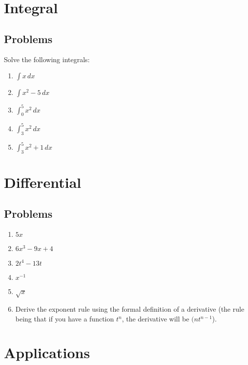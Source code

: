 \documentclass{book}
\begin{document}
\part{Integral}



\chapter{Problems}
Solve the following integrals:

\begin{enumerate}
    \item $\int x \, dx$
    \item $\int x^2-5 \, dx$
    \item $\int^5_0 x^2 \, dx$
    \item $\int^5_3 x^2 \, dx$
    \item $\int^5_3 x^2 + 1 \, dx$
\end{enumerate}

\part{Differential}



\chapter{Problems}
\begin{enumerate}
    \item $5x$
    \item $6x^3 - 9x + 4$
    \item $2t^4 - 13t$
    \item $x^{-1}$
    \item $\sqrt{x}$
    \item Derive the exponent rule using the formal definition of a derivative (the rule being that if you have a function $t^n$, the derivative will be $(nt^{n-1}$).
\end{enumerate}

\part{Applications}


\backmatter
\end{document}
